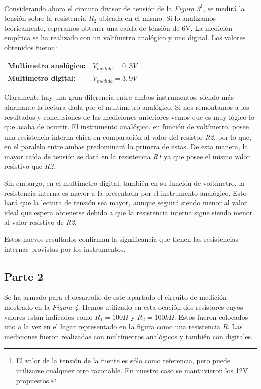\documentclass{article}
\begin{document}
	Considerando ahora el circuito divisor de tensión de la \textit{Figura 3}\footnote{El valor de la tensión de la fuente es sólo como referencia, pero puede utilizarse cualquier otro razonable. En nuestro caso se mantuvieron los 12V propuestos.}, se medirá la tensión sobre la resistencia $R_2$ ubicada en el mismo. Si lo analizamos teóricamente, esperamos obtener una caída de tensión de 6V. La medición empírica se ha realizado con un voltímetro analógico y uno digital. Los valores obtenidos fueron:
\bigskip\medskip

\begin{tabular}{l l}
	\textbf{Multímetro analógico:} & $V_{medido} = 0,3V$ \smallskip\\
	\textbf{Multímetro digital:} & $V_{medido} = 3,9V$ \\
\end{tabular}
\bigskip\bigskip


\noindent Claramente hay una gran diferencia entre ambos instrumentos, siendo más alarmante la lectura dada por el multímetro analógico. Si nos remontamos a los resultados y conclusiones de las mediciones anteriores vemos que es muy lógico lo que acaba de ocurrir. El instrumento analógico, en función de voltímetro, posee una resistencia interna chica en comparación al valor del resistor \textit{R2}, por lo que, en el paralelo entre ambas predominará la primera de estas. De esta manera, la mayor caída de tensión se dará en la resistencia \textit{R1} ya que posee el mismo valor resistivo que \textit{R2}.
	\par
	Sin embargo, en el multímetro digital, también en su función de voltímetro, la resistencia interna es mayor a la presentada por el instrumento analógico. Esto hará que la lectura de tensión sea mayor, aunque seguirá siendo menor al valor ideal que espera obtenerse debido a que la resistencia interna sigue siendo menor al valor resistivo de \textit{R2}.
	\par
	Estos nuevos resultados confirman la significancia que tienen las resistencias internas provistas por los instrumentos.
\bigskip\bigskip




\subsection{Parte 2}


	Se ha armado para el desarrollo de este apartado el circuito de medición mostrado en la \textit{Figura 4}. Hemos utilizado en esta ocación dos resistores cuyos valores están indicados como \textit{$R_1=100\Omega$} y \textit{$R_2=100k\Omega$}. Estos fueron colocados uno a la vez en el lugar representado en la figura como una resistencia \textit{R}. Las mediciones fueron realizadas con multímetros analógicos y también con digitales.
\bigskip
\end{document}

